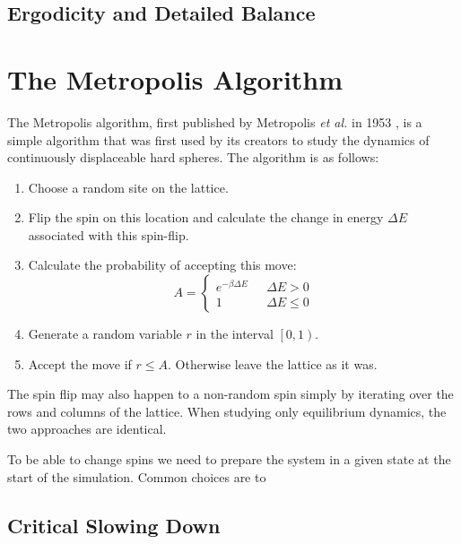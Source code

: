 \documentclass[11pt, a4paper]{report} %
\begin{document}
\subsection{Ergodicity and Detailed Balance}

\section{The Metropolis Algorithm}
The Metropolis algorithm, first published by Metropolis \textit{et al.} in 1953 \cite{metropolis:1953}, is a simple algorithm that was first used by its creators to study the dynamics of continuously displaceable hard spheres.
The algorithm is as follows\cite{binney:1992}:
\begin{enumerate}
	\item Choose a random site on the lattice.
	\item Flip the spin on this location and calculate the change in energy \(\Delta E\) associated with this spin-flip.
	\item Calculate the probability of accepting this move:
	\begin{equation}
		A =
		\begin{cases}
			e^{-\beta \Delta E}\ \ \ &\Delta E > 0 \\
			1 \ \ \ &\Delta E \leq 0
		\end{cases}
	\end{equation}
	\item Generate a random variable \(r\) in the interval \(\left[0, 1\right)\).
	\item Accept the move if \(r \leq A\). Otherwise leave the lattice as it was.
\end{enumerate}
The spin flip may also happen to a non-random spin simply by iterating over the rows and columns of the lattice. When studying only equilibrium dynamics, the two approaches are identical.\cite{landau:2015}

To be able to change spins we need to prepare the system in a given state at the start of the simulation.
Common choices are to



\subsection{Critical Slowing Down} \label{sec:critical_slowing_down}
\end{document}
